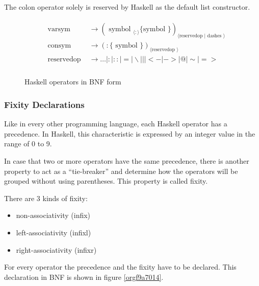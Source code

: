 \documentclass[a4paper, titlepage, twoside]{article}
\begin{document}
The colon operator solely is reserved by Haskell as the default list constructor.

\begin{figure}
\begin{displaymath}
\begin{aligned}
&\begin{array}{ll}
\text { varsym } & \rightarrow \left(\text { symbol }_{\langle:\rangle}\{\text {symbol }\}\right)_{\langle\text {reservedop }| \text { dashes }\rangle} \\
\text { consym } & \rightarrow(:\{\text { symbol }\})_{\langle\text {reservedop }\rangle} \\
\text { reservedop } & \rightarrow \ldots|:|::|=| \backslash|||<-|->|@| \sim \mid=> \\
\end{array}
\end{aligned}
\end{displaymath}
\caption{\label{org45e8d3b}Haskell operators in BNF form}
\end{figure}

\subsubsection{Fixity Declarations}
\label{sec:org4f3e570}

Like in every other programming language, each Haskell operator has a precedence. In Haskell, this characteristic is expressed by an integer value in the range of 0 to 9.

In case that two or more operators have the same precedence, there is another property to act as a ``tie-breaker'' and determine how the operators will be grouped without using parentheses. This property is called fixity.

There are 3 kinds of fixity:

\begin{itemize}
\item non-associativity (infix)
\item left-associativity (infixl)
\item right-associativity (infixr)
\end{itemize}

For every operator the precedence and the fixity have to be declared. This declaration in BNF is shown in figure \ref{orgf9a7014}.
\end{document}
